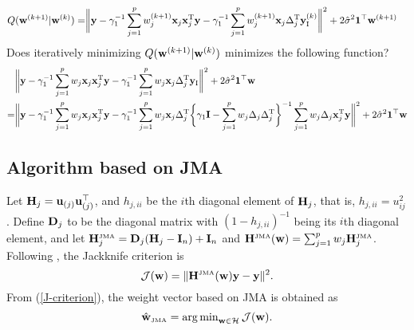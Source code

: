 \documentclass[12pt,hidelinks]{article}
\begin{document}
{\blue
\begin{align}
  Q(\mathbf{w}^{(k+1)}|\mathbf{w}^{(k)})
  =&\bigg\|\mathbf{y}-\gamma_1^{-1}\sum_{j=1}^p{w}^{(k+1)}_j\mathbf{x}_j\mathbf{x}_j^{\rm T}\mathbf{y}
    -\gamma_1^{-1}\sum_{j=1}^p{w}^{(k+1)}_j
     \mathbf{x}_j\Delta_j^{\rm T}\mathbf{y}_{\mathrm{I}}^{(k)}\bigg\|^2
  +2\hat{\sigma}^2\mathbf{1}^{\top}\mathbf{w}^{(k+1)}
\end{align}
Does iteratively minimizing $Q(\mathbf{w}^{(k+1)}|\mathbf{w}^{(k)})$ minimizes the following function?
\begin{align}
  &\bigg\|\mathbf{y}-\gamma_1^{-1}\sum_{j=1}^pw_j\mathbf{x}_j\mathbf{x}_j^{\rm T}\mathbf{y}
    -\gamma_1^{-1}\sum_{j=1}^pw_j\mathbf{x}_j\Delta_j^{\rm T}\mathbf{y}_{\mathrm{I}}\bigg\|^2
    +2\hat{\sigma}^2\mathbf{1}^{\top}\mathbf{w}\\
  =&\bigg\|\mathbf{y}-\gamma_1^{-1}\sum_{j=1}^pw_j\mathbf{x}_j\mathbf{x}_j^{\rm T}\mathbf{y}
     -\gamma_1^{-1}\sum_{j=1}^pw_j\mathbf{x}_j\Delta_j^{\rm T}
     \bigg\{\gamma_1\mathbf{I}-\sum_{j=1}^pw_j
    \Delta_j\Delta_j^{\rm T}\bigg\}^{-1}
    \sum_{j=1}^pw_j\Delta_j\mathbf{x}_j^{\rm T}\mathbf{y}\bigg\|^2
    +2\hat{\sigma}^2\mathbf{1}^{\top}\mathbf{w}
\end{align}
}


\subsection{Algorithm based on JMA}

Let $\mathbf{H}_j=\mathbf{u}_{(j)}\mathbf{u}_{(j)}^{\top}$, and
$h_{j,ii}$ be the $i$th diagonal element of $\mathbf{H}_j$, that is, $h_{j,ii}=u_{ij}^2$.
Define $\mathbf{D}_j$ to be the diagonal matrix with $(1-h_{j,ii})^{-1}$ being its $i$th
diagonal element, and let
$\mathbf{H}^{\mbox{\tiny\rm JMA}}_{j} = \mathbf{D}_j(\mathbf{H}_j - \mathbf{I}_n) + \mathbf{I}_n$
and
 $\mathbf{H}^{\mbox{\tiny\rm JMA}}(\mathbf{w})=\sum_{j=1}^p w_j\mathbf{H}^{\mbox{\tiny\rm JMA}}_j$.
Following \cite{Hansen:12}, the Jackknife criterion is
\begin{equation}\label{J-criterion}
{\cal J}(\mathbf{w})=\|\mathbf{H}^{\mbox{\tiny\rm JMA}}(\mathbf{w})\mathbf{y}-\mathbf{y}\|^2.
\end{equation}
From (\ref{J-criterion}), the weight vector based on JMA is obtained as
\begin{equation*}
  \hat{\mathbf{w}}_{{\mbox{\tiny\rm JMA}}}
  =\mathop{\arg\min}\nolimits_{\mathbf{w}\in\mathcal{H}}{{\cal J}}(\mathbf{w}).
\end{equation*}
\end{document}
